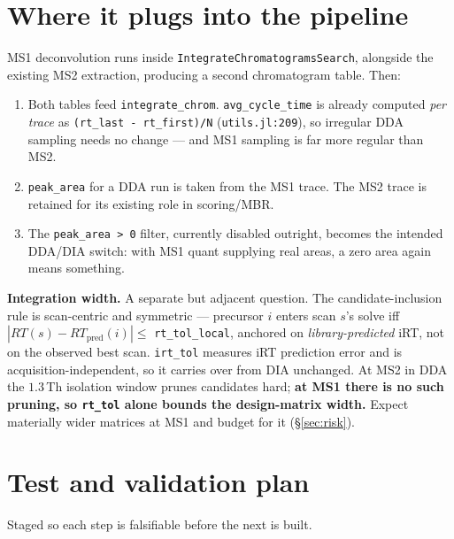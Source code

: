 \documentclass[11pt]{article}
\newcommand{\code}[1]{\texttt{\small #1}}
\newcommand{\file}[1]{\textcolor{blue!50!black}{\texttt{\small #1}}}
\begin{document}
\section{Where it plugs into the pipeline}

MS1 deconvolution runs inside \code{IntegrateChromatogramsSearch}, alongside the existing MS2
extraction, producing a second chromatogram table. Then:

\begin{enumerate}[nosep]
  \item Both tables feed \code{integrate\_chrom}. \code{avg\_cycle\_time} is already computed
        \emph{per trace} as \code{(rt\_last - rt\_first)/N} (\file{utils.jl:209}), so irregular
        DDA sampling needs no change --- and MS1 sampling is far more regular than MS2.
  \item \code{peak\_area} for a DDA run is taken from the MS1 trace. The MS2 trace is retained
        for its existing role in scoring/MBR.
  \item The \code{peak\_area > 0} filter, currently disabled outright, becomes the intended
        DDA/DIA switch: with MS1 quant supplying real areas, a zero area again means something.
\end{enumerate}

\noindent\textbf{Integration width.} A separate but adjacent question. The candidate-inclusion rule
is scan-centric and symmetric --- precursor $i$ enters scan $s$'s solve iff
$|RT(s) - RT_{\text{pred}}(i)| \le$ \code{rt\_tol\_local}, anchored on \emph{library-predicted}
iRT, not on the observed best scan. \code{irt\_tol} measures iRT prediction error and is
acquisition-independent, so it carries over from DIA unchanged. At MS2 in DDA the $1.3$\,Th
isolation window prunes candidates hard; \textbf{at MS1 there is no such pruning, so
\code{rt\_tol} alone bounds the design-matrix width.} Expect materially wider matrices at MS1 and
budget for it (\S\ref{sec:risk}).

\section{Test and validation plan}

Staged so each step is falsifiable before the next is built.
\end{document}
